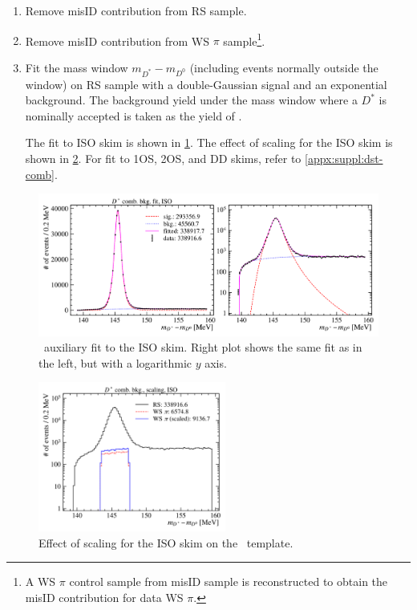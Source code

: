 \begin{enumerate}
    \item Remove misID contribution from RS sample.
    \item Remove misID contribution from WS $\pi$ sample\footnote{
            A WS $\pi$ control sample from misID sample is reconstructed to
            obtain the misID contribution for data WS $\pi$.
        }.
    \item Fit the mass window $m_{D^*} - m_{D^0}$ (including events normally
        outside the window) on RS sample with a
        double-Gaussian signal and an exponential background.
        The background yield under the mass window where a $D^*$ is nominally
        accepted is taken as the yield of \DstComb.

        The fit to ISO skim is shown in \cref{fig:dst-comb-fit}.
        The effect of scaling for the ISO skim is shown in
        \cref{fig:dst-comb-scale}.
        For fit to 1OS, 2OS, and DD skims, refer to \cref{appx:suppl:dst-comb}.
\end{enumerate}


\begin{figure}[htb]
    \centering
    \includegraphics[width=\textwidth]{figs-fit-fit-templates/data-driven-plots/dst_comb/fit_dst_comb_iso_comb.pdf}
    \caption{
        \DstComb\ auxiliary fit to the ISO skim.
        Right plot shows the same fit as in the left, but with a logarithmic $y$
        axis.
    }
    \label{fig:dst-comb-fit}
\end{figure}

\begin{figure}[htb]
    \centering
    \includegraphics[width=0.55\textwidth]{figs-fit-fit-templates/data-driven-plots/dst_comb/fit_dst_comb_scaled_comp_iso_log.pdf}
    \caption{
        Effect of scaling for the ISO skim on the \DstComb\ template.
    }
    \label{fig:dst-comb-scale}
\end{figure}


